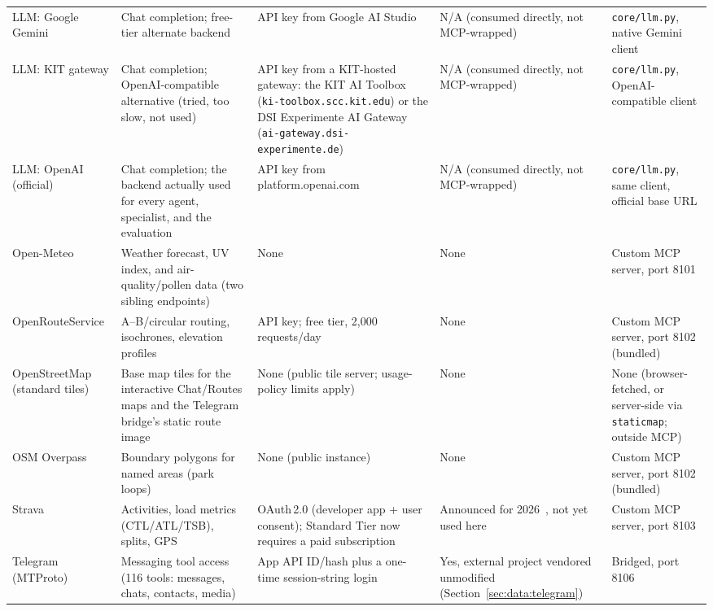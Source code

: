 \begin{landscape}
\begin{longtable}{p{2.6cm}p{3.8cm}p{4.2cm}p{3.2cm}p{3.2cm}}
\addlinespace
LLM: Google Gemini & Chat completion; free-tier alternate backend & API key from Google AI Studio & N/A (consumed directly, not MCP-wrapped) & \texttt{core/llm.py}, native Gemini client \\
\addlinespace
LLM: KIT gateway & Chat completion; OpenAI-compatible alternative (tried, too slow, not used) & API key from a KIT-hosted gateway: the KIT AI Toolbox (\texttt{ki-toolbox.scc.kit.edu}) or the DSI Experimente AI Gateway (\texttt{ai-gateway.dsi-experimente.de}) & N/A (consumed directly, not MCP-wrapped) & \texttt{core/llm.py}, OpenAI-compatible client \\
\addlinespace
LLM: OpenAI (official) & Chat completion; the backend actually used for every agent, specialist, and the evaluation & API key from platform.openai.com & N/A (consumed directly, not MCP-wrapped) & \texttt{core/llm.py}, same client, official base URL \\
\addlinespace
Open-Meteo & Weather forecast, UV index, and air-quality/pollen data (two sibling endpoints) & None & None & Custom MCP server, port 8101 \\
\addlinespace
OpenRoute\-Service & A--B/circular routing, isochrones, elevation profiles & API key; free tier, 2{,}000 requests/day & None & Custom MCP server, port 8102 (bundled) \\
\addlinespace
OpenStreetMap (standard tiles) & Base map tiles for the interactive Chat/Routes maps and the Telegram bridge's static route image & None (public tile server; usage-policy limits apply) & None & None (browser-fetched, or server-side via \texttt{staticmap}; outside MCP) \\
\addlinespace
OSM Overpass & Boundary polygons for named areas (park loops) & None (public instance) & None & Custom MCP server, port 8102 (bundled) \\
\addlinespace
Strava & Activities, load metrics (CTL/ATL/TSB), splits, GPS & OAuth\,2.0 (developer app + user consent); Standard Tier now requires a paid subscription~\citep{strava_api_update_2026} & Announced for 2026~\citep{strava_api_update_2026}, not yet used here & Custom MCP server, port 8103 \\
\addlinespace
Telegram (MTProto) & Messaging tool access (116 tools: messages, chats, contacts, media) & App API ID/hash plus a one-time session-string login & Yes, external project vendored unmodified (Section~\ref{sec:data:telegram}) & Bridged, port 8106 \\
\end{longtable}
\end{landscape}
